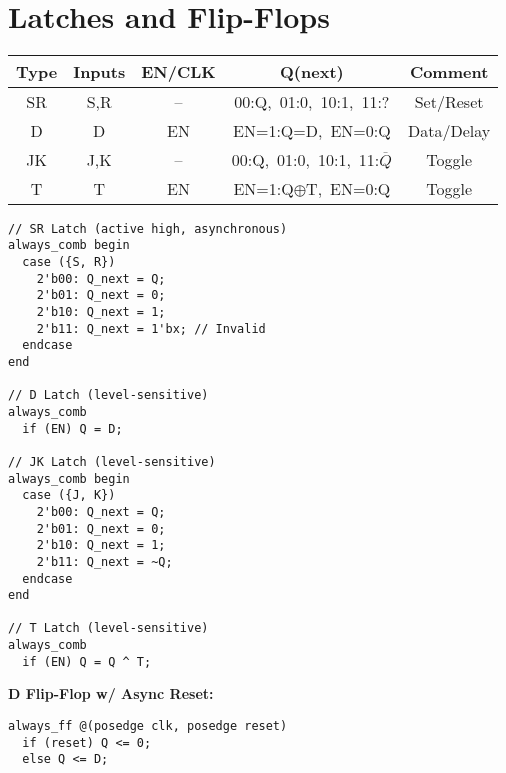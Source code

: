 \documentclass[8pt]{article}
\begin{document}
\noindent \makebox[1.5in]{\hrulefill} \\[-2pt]

\section*{Latches and Flip-Flops}
\begin{tabular}{|c|c|c|c|c|}
    \hline
    Type & Inputs & EN/CLK & Q(next)                                & Comment    \\
    \hline
    SR   & S,R    & --     & 00:Q,\ 01:0,\ 10:1,\ 11:?              & Set/Reset  \\
    D    & D      & EN     & EN=1:Q=D,\ EN=0:Q                      & Data/Delay \\
    JK   & J,K    & --     & 00:Q,\ 01:0,\ 10:1,\ 11:$\overline{Q}$ & Toggle     \\
    T    & T      & EN     & EN=1:Q$\oplus$T,\ EN=0:Q               & Toggle     \\
    \hline
\end{tabular}

\begin{lstlisting}
// SR Latch (active high, asynchronous)
always_comb begin
  case ({S, R})
    2'b00: Q_next = Q;
    2'b01: Q_next = 0;
    2'b10: Q_next = 1;
    2'b11: Q_next = 1'bx; // Invalid
  endcase
end

// D Latch (level-sensitive)
always_comb
  if (EN) Q = D;

// JK Latch (level-sensitive)
always_comb begin
  case ({J, K})
    2'b00: Q_next = Q;
    2'b01: Q_next = 0;
    2'b10: Q_next = 1;
    2'b11: Q_next = ~Q;
  endcase
end

// T Latch (level-sensitive)
always_comb
  if (EN) Q = Q ^ T;
\end{lstlisting}

\textbf{D Flip-Flop w/ Async Reset:}
\begin{lstlisting}
always_ff @(posedge clk, posedge reset)
  if (reset) Q <= 0;
  else Q <= D;
\end{lstlisting}

\end{document}
